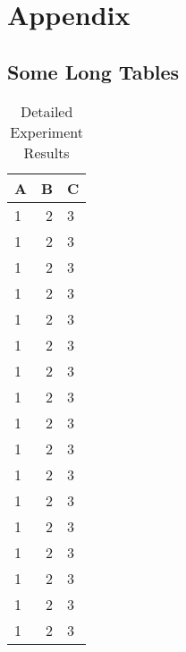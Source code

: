 \part{Appendix}

\chapter{Some Long Tables}
\lipsum[1]

\begin{table}[htb]
\scriptsize
\centering
\caption{Detailed Experiment Results}
\label{tab:appendix:engines:bpel}
\begin{tabular}{lrl}
	\toprule
\textbf{A} & \textbf{B} & \textbf{C} \\
\midrule
1 & 2 & 3 \\
1 & 2 & 3 \\
1 & 2 & 3 \\
1 & 2 & 3 \\
1 & 2 & 3 \\
1 & 2 & 3 \\
1 & 2 & 3 \\
1 & 2 & 3 \\
1 & 2 & 3 \\
1 & 2 & 3 \\
1 & 2 & 3 \\
1 & 2 & 3 \\
1 & 2 & 3 \\
1 & 2 & 3 \\
1 & 2 & 3 \\
1 & 2 & 3 \\
1 & 2 & 3 \\
\bottomrule
\end{tabular}
\end{table}
